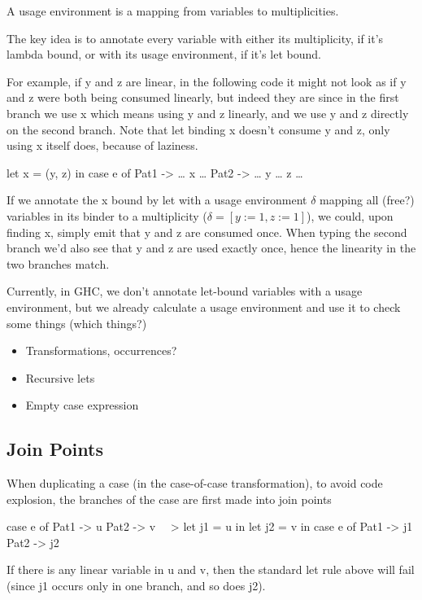 \documentclass[10pt, a4paper, draft]{article}
\begin{document}
A usage environment is a mapping from variables to multiplicities.

The key idea is to annotate every variable with either its multiplicity, if it's
lambda bound, or with its usage environment, if it's let bound.

For example, if y and z are linear, in the following code it might not look as
if y and z were both being consumed linearly, but indeed they are since in the
first branch we use x which means using y and z linearly, and we use y and z
directly on the second branch. Note that let binding x doesn't consume y and z,
only using x itself does, because of laziness.
\begin{code}
let x = (y, z) in
case e of
  Pat1 -> … x …
  Pat2 -> … y … z …
\end{code}

If we annotate the x bound by let with a usage environment $\delta$ mapping all (free?)
variables in its binder to a multiplicity ($\delta = [y := 1, z := 1]$), we
could, upon finding x, simply emit that y and z are consumed once. When typing
the second branch we'd also see that y and z are used exactly once, hence the
linearity in the two branches match.

Currently, in GHC, we don't annotate let-bound variables with a usage
environment, but we already calculate a usage environment and use it to check
some things (which things?)

\begin{itemize}
    \item Transformations, occurrences?
    \item Recursive lets
    \item Empty case expression
\end{itemize}

\subsection{Join Points}

When duplicating a case (in the case-of-case transformation), to avoid code
explosion, the branches of the case are first made into join points

\begin{code}
case e of
  Pat1 -> u
  Pat2 -> v
~~>
let j1 = u in
let j2 = v in
case e of
  Pat1 -> j1
  Pat2 -> j2
\end{code}

If there is any linear variable in u and v, then the standard
let rule above will fail (since j1 occurs only in one branch, and
so does j2).
\end{document}
